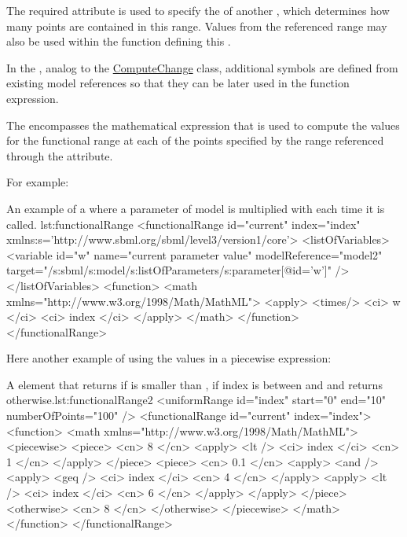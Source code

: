 The required attribute  is used to specify the  of another , which determines how many points are contained in this range.
Values from the referenced range may also be used within the function defining this .

In the , analog to the \hyperref[class:computeChange]{ComputeChange} class,  additional symbols are defined from existing model references so that they can be later used in the function expression. 

The  encompasses the mathematical expression that is used to compute the values for the functional range at each of the points specified by the range referenced through the  attribute. 

For example:

\begin{myXmlLst}{An example of a  where a parameter  of model  is multiplied with  each time it is called. }{lst:functionalRange}
  <functionalRange id="current" index="index"
      xmlns:s='http://www.sbml.org/sbml/level3/version1/core'>
    <listOfVariables>
      <variable id="w" name="current parameter value" modelReference="model2"
          target="/s:sbml/s:model/s:listOfParameters/s:parameter[@id='w']" />
    </listOfVariables>
    <function>
      <math xmlns="http://www.w3.org/1998/Math/MathML">
        <apply>
          <times/>
          <ci> w </ci>
          <ci> index </ci>
        </apply>
      </math>
    </function>
  </functionalRange>
\end{myXmlLst}

Here another example of using the values in a piecewise expression: 

\begin{myXmlLst}{A  element that returns  if 
   is smaller than ,  if index is between 
	 and  and returns  otherwise.}{lst:functionalRange2}
        <uniformRange id="index" start="0" end="10" numberOfPoints="100" />
        <functionalRange id="current" index="index">
          <function>
            <math xmlns="http://www.w3.org/1998/Math/MathML">
              <piecewise>
                <piece>
                  <cn> 8 </cn>
                  <apply>
                    <lt />
                    <ci> index </ci>
                    <cn> 1 </cn>
                  </apply>
                </piece>
                <piece>
                  <cn> 0.1 </cn>
                  <apply>
                    <and />
                    <apply>
                      <geq />
                      <ci> index </ci>
                      <cn> 4 </cn>
                    </apply>
                    <apply>
                      <lt />
                      <ci> index </ci>
                      <cn> 6 </cn>
                    </apply>
                  </apply>
                </piece>
                <otherwise>
                  <cn> 8 </cn>
                </otherwise>
              </piecewise>
            </math>
          </function>
        </functionalRange>
\end{myXmlLst}



